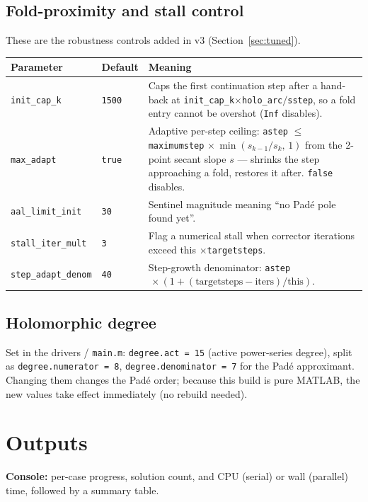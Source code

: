 \documentclass[11pt,a4paper]{article}
\newcommand{\code}[1]{\texttt{#1}}
\begin{document}
\subsection{Fold-proximity and stall control}
These are the robustness controls added in v3 (Section~\ref{sec:tuned}).
\begin{center}\small
\begin{longtable}{@{}p{}p{}p{}@{}}
\toprule
\textbf{Parameter} & \textbf{Default} & \textbf{Meaning}\\
\midrule\endhead
\code{init_cap_k}    & \code{1500} & Caps the first continuation step after a hand-back at \code{init_cap_k}$\times$\code{holo_arc}$/$\code{sstep}, so a fold entry cannot be overshot (\code{Inf} disables).\\
\code{max_adapt}     & \code{true} & Adaptive per-step ceiling: \code{astep} $\le$ \code{maximumstep}$\,\times\min(s_{k-1}/s_k,\,1)$ from the 2-point secant slope $s$ --- shrinks the step approaching a fold, restores it after. \code{false} disables.\\
\code{aal_limit_init}& \code{30}   & Sentinel magnitude meaning ``no Pad\'e pole found yet''.\\
\code{stall_iter_mult}& \code{3}   & Flag a numerical stall when corrector iterations exceed this $\times$\code{targetsteps}.\\
\code{step_adapt_denom}& \code{40} & Step-growth denominator: \code{astep}$\,\times(1+(\text{targetsteps}-\text{iters})/\text{this})$.\\
\bottomrule
\end{longtable}
\end{center}

\subsection{Holomorphic degree}
Set in the drivers / \code{main.m}: \code{degree.act = 15} (active power-series degree),
split as \code{degree.numerator = 8}, \code{degree.denominator = 7} for the Pad\'e
approximant. Changing them changes the Pad\'e order; because this build is pure MATLAB,
the new values take effect immediately (no rebuild needed).

\section{Outputs}

\textbf{Console:} per-case progress, solution count, and CPU (serial) or wall (parallel)
time, followed by a summary table.
\end{document}
